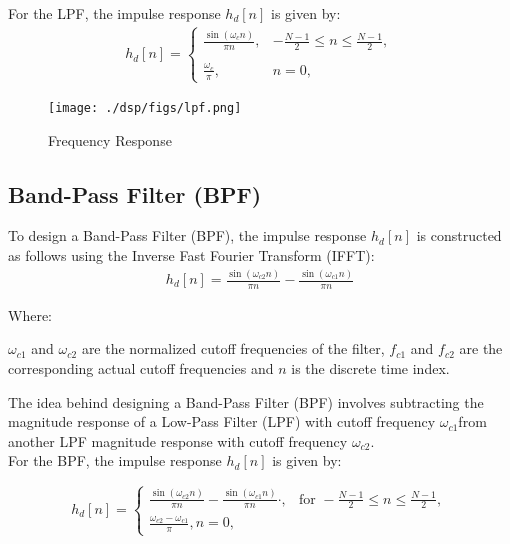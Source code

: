 \documentclass{article}
\begin{document}
For the LPF, the impulse response $ h_d[n]$ is given by:
\begin{align}
h_d[n] = \begin{cases}
    \frac{\sin(\omega_c n)}{\pi  n}, &  -\frac{N - 1}{2} \leq n \leq \frac{N - 1}{2}, \\
    \\
    \frac{\omega_c}{\pi}, &  n = 0,
\end{cases} \nonumber
\end{align}
\begin{figure}[ht]
  \centering
  \texttt{[image: ./dsp/figs/lpf.png]}
  \caption{Frequency Response}
  \label{fig:lpf}
\end{figure}
\begin{center}
\end{center}
\subsection{Band-Pass Filter (BPF)}
To design a Band-Pass Filter (BPF), the impulse response \( h_d[n] \) is constructed as follows using the Inverse Fast Fourier Transform (IFFT):
\begin{align}
h_d[n] = \frac{{\sin(\omega_{c2} n)}}{\pi n} - \frac{{\sin(\omega_{c1} n)}}{\pi n}
\end{align}



Where:

   \(\omega_{c1}\) and \(\omega_{c2}\) are the normalized cutoff frequencies of the filter,
   \(f_{c1}\) and \(f_{c2}\) are the corresponding actual cutoff frequencies and
   \(n\) is the discrete time index.

The idea behind designing a Band-Pass Filter (BPF) involves subtracting the magnitude response of a Low-Pass Filter (LPF) with cutoff frequency $\omega_{c1}$from another LPF magnitude response with cutoff frequency \(\omega_{c2}\).\\

For the BPF, the impulse response \(h_d[n]\) is given by:

\begin{equation}
h_d[n] = \begin{cases}
    \frac{{\sin(\omega_{c2} n)}}{\pi n} - \frac{{\sin(\omega_{c1} n)}}{\pi n} \cdot , & \text{for } -\frac{N - 1}{2} \leq n \leq \frac{N - 1}{2}, \\
  \frac{{\omega_{c2} - \omega_{c1}}}{{\pi}},n=  0,
\end{cases}
\end{equation}
\end{document}

